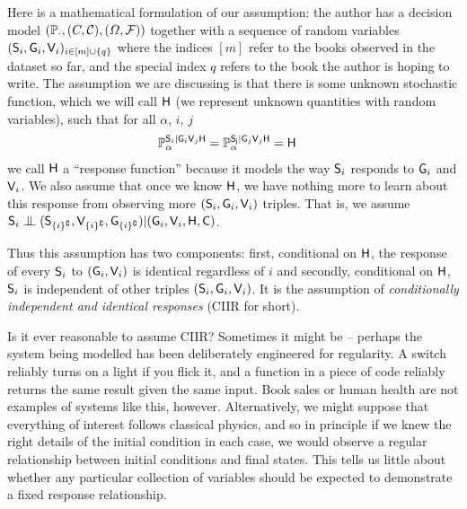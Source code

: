 Here is a mathematical formulation of our assumption: the author has a decision model $(\mathbb{P}_{\cdot}, (C,\mathcal{C}), (\Omega,\mathcal{F}))$ together with a sequence of random variables $(\mathsf{S}_i, \mathsf{G}_i, \mathsf{V}_i)_{i\in [m]\cup \{q\}}$ where the indices $[m]$ refer to the books observed in the dataset so far, and the special index $q$ refers to the book the author is hoping to write. The assumption we are discussing is that there is some unknown stochastic function, which we will call $\mathsf{H}$ (we represent unknown quantities with random variables), such that for all $\alpha$, $i$, $j$
\begin{align}
    \mathbb{P}_\alpha^{\mathsf{S}_i|\mathsf{G}_i\mathsf{V}_j\mathsf{H}} &= \mathbb{P}_\alpha^{\mathsf{S_j}|\mathsf{G}_j\mathsf{V}_j\mathsf{H}} = \mathsf{H}
\end{align}
we call $\mathsf{H}$ a ``response function'' because it models the way $\mathsf{S}_i$ responds to $\mathsf{G}_i$ and $\mathsf{V}_i$. We also assume that once we know $\mathsf{H}$, we have nothing more to learn about this response from observing more $(\mathsf{S}_i, \mathsf{G}_i, \mathsf{V}_i)$ triples. That is, we assume $\RV{S}_i \CI (\RV{S}_{\{i\}^\complement}, \RV{V}_{\{i\}^\complement}, \RV{G}_{\{i\}^\complement}) | (\RV{G}_i, \RV{V}_i, \RV{H}, \RV{C})$.

Thus this assumption has two components: first, conditional on $\mathsf{H}$, the response of every $\mathsf{S}_i$ to $(\mathsf{G}_i, \mathsf{V}_i)$ is identical regardless of $i$ and secondly, conditional on $\mathsf{H}$, $\mathsf{S}_i$ is independent of other triples $(\mathsf{S}_i, \mathsf{G}_i, \mathsf{V}_i)$. It is the assumption of \emph{conditionally independent and identical responses} (CIIR for short).

Is it ever reasonable to assume CIIR? Sometimes it might be -- perhaps the system being modelled has been deliberately engineered for regularity. A switch reliably turns on a light if you flick it, and a function in a piece of code reliably returns the same result given the same input. Book sales or human health are not examples of systems like this, however. Alternatively, we might suppose that everything of interest follows classical physics, and so in principle if we knew the right details of the initial condition in each case, we would observe a regular relationship between initial conditions and final states. This tells us little about whether any particular collection of variables should be expected to demonstrate a fixed response relationship. 

